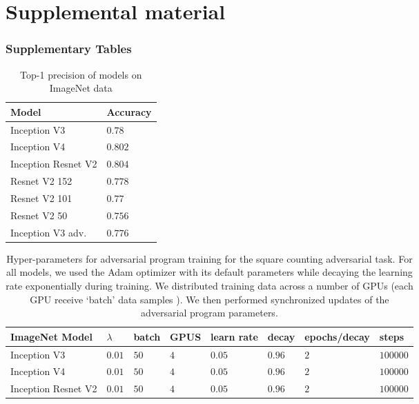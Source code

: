 \documentclass{article}
\begin{document}
\clearpage
\appendix
\normalsize
\onecolumn\part*{Supplemental material}\setcounter{figure}{0}\setcounter{table}{0}\section{Supplementary Tables}\label{sec: supp tables}\begin{table}[!hbt]
  \caption{Top-1 precision of models on ImageNet data}
  \label{table: ImageNet precision}
  \centering
  \begin{tabular}{ll}
    \toprule
    Model      & Accuracy \\
    \midrule
    Inception V3  &  $0.78$     \\
    Inception V4  & $0.802$     \\
    Inception Resnet V2  & $0.804$     \\
    Resnet V2 152  &  $0.778$     \\
    Resnet V2 101  &  $0.77$    \\
    Resnet V2 50 & $0.756$ \\
    Inception V3  adv. &  $0.776$     \\
    \bottomrule
  \end{tabular}
\end{table}\begin{table}
  \caption{Hyper-parameters for adversarial program training for the square counting adversarial task. For all models, we used the Adam optimizer with its default parameters while decaying the learning rate exponentially during training. We distributed training data across a number of GPUs (each GPU receive `batch' data samples ). We then performed synchronized updates of the adversarial program parameters.}
  \label{table: hyperparams count}
  \centering
  \begin{tabular}{llllllll}
    \toprule
     ImageNet Model &  $\lambda$ & batch & GPUS & learn rate & decay & epochs/decay & steps \\
     \midrule
    Inception V3                 & $0.01$ & $50$  & $4$  &  $0.05$ & $0.96$ & $2$ & $100000$  \\
    Inception V4                & $0.01$ & $50$  & $4$  &  $0.05$ & $0.96$ & $2$ & $100000$  \\
    Inception Resnet V2    & $0.01$ & $50$  & $4$  &  $0.05$ & $0.96$ & $2$ & $100000$  \\

\end{tabular}
\end{table}
\end{document}
